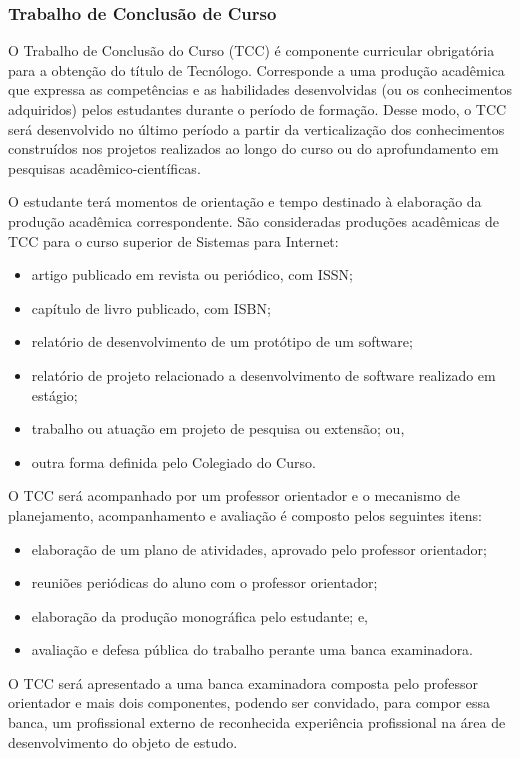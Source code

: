 \subsubsection{Trabalho de Conclusão de Curso}

O Trabalho de Conclusão do Curso (TCC) é componente curricular obrigatória para a obtenção do título de Tecnólogo. Corresponde a uma produção acadêmica que expressa as competências e as habilidades desenvolvidas (ou os conhecimentos adquiridos) pelos estudantes durante o período de formação. Desse modo, o TCC será desenvolvido no último período a partir da verticalização dos conhecimentos construídos nos projetos realizados ao longo do curso ou do aprofundamento em pesquisas acadêmico-científicas.

O estudante terá momentos de orientação e tempo destinado à elaboração da produção acadêmica correspondente. São consideradas produções acadêmicas de TCC para o curso superior de Sistemas para Internet:

\begin{itemize}
	\item artigo publicado em revista ou periódico, com ISSN;
	\item capítulo de livro publicado, com ISBN;
	\item relatório de desenvolvimento de um protótipo de um software;
	\item relatório de projeto relacionado a desenvolvimento de software realizado em estágio;
	\item trabalho ou atuação em projeto de pesquisa ou extensão; ou,
	\item outra forma definida pelo Colegiado do Curso.
\end{itemize}
	
O TCC será acompanhado por um professor orientador e o mecanismo de planejamento, acompanhamento e avaliação é composto pelos seguintes itens:
\begin{itemize}
	\item elaboração de um plano de atividades, aprovado pelo professor orientador;
	\item reuniões periódicas do aluno com o professor orientador;
	\item elaboração da produção monográfica pelo estudante; e,
	\item avaliação e defesa pública do trabalho perante uma banca examinadora.
\end{itemize}

O TCC será apresentado a uma banca examinadora composta pelo professor orientador e mais dois componentes, podendo ser convidado, para compor essa banca, um profissional externo de reconhecida experiência profissional na área de desenvolvimento do objeto de estudo.

